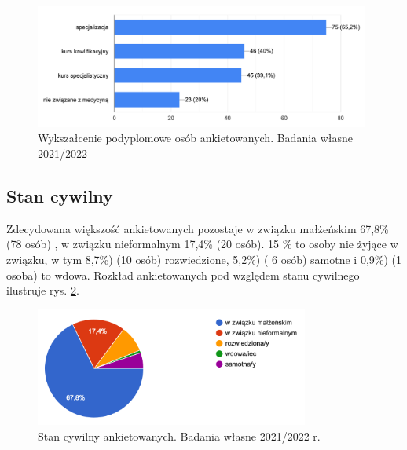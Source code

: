 \documentclass[a4paper,12pt,twoside,openany]{report}
\begin{document}
\begin{figure}[h]
\includegraphics[width=11cm]{char_gr_bad/podyplom00}
\caption{Wykszałcenie podyplomowe osób ankietowanych. Badania własne 2021/2022}
\label{rys:podyplom}
\end{figure}


\subsection*{Stan cywilny}
Zdecydowana większość ankietowanych pozostaje  w związku małżeńskim 67,8\%  (78 osób) , w związku nieformalnym 17,4\% (20 osób). 15 \% to osoby nie żyjące w związku, w tym  8,7\%) (10 osób) rozwiedzione,  5,2\%) ( 6 osób) samotne i 0,9\%)  (1 osoba)  to wdowa. Rozkład ankietowanych pod względem stanu cywilnego ilustruje rys. \ref{rys:cywil}.

\begin{figure}[h]
\includegraphics[width=9cm]{char_gr_bad/cyw00}
\caption{Stan cywilny ankietowanych. Badania własne 2021/2022 r.}
\label{rys:cywil}
\end{figure}
\end{document}

